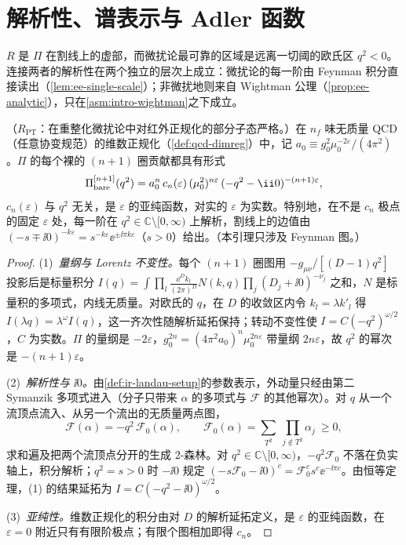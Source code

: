\section{解析性、谱表示与 Adler 函数}\label{sec:ee-analytic}

$R$ 是 $\Pi$ 在割线上的虚部，而微扰论最可靠的区域是远离一切阈的欧氏区 $q^2<0$。连接两者的解析性在两个独立的层次上成立：微扰论的每一阶由 Feynman 积分直接读出（\cref{lem:ee-single-scale}）；非微扰地则来自 Wightman 公理（\cref{prop:ee-analytic}），只在\cref{asm:intro-wightman}之下成立。

\begin{lemma}\label{lem:ee-single-scale}
（$R_{\mathrm{PT}}$：在重整化微扰论中对红外正规化的部分子态严格。）在 $n_f$ 味无质量 QCD（任意协变规范）的维数正规化（\cref{def:qcd-dimreg}）中，记 $a_0\equiv g_0^2\mu_0^{-2\varepsilon}/(4\pi^2)$。$\Pi$ 的每个裸的 $(n+1)$ 圈贡献都具有形式
\begin{equation}\label{eq:ee-single-scale}
\Pi^{[n+1]}_{\rm bare}(q^2)=a_0^n\,c_n(\varepsilon)\,(\mu_0^2)^{n\varepsilon}\,(-q^2-\ii0)^{-(n+1)\varepsilon},
\end{equation}
$c_n(\varepsilon)$ 与 $q^2$ 无关，是 $\varepsilon$ 的亚纯函数，对实的 $\varepsilon$ 为实数。特别地，在不是 $c_n$ 极点的固定 $\varepsilon$ 处，每一阶在 $q^2\in\mathbb C\setminus[0,\infty)$ 上解析，割线上的边值由 $(-s\mp\ii0)^{-k\varepsilon}=s^{-k\varepsilon}\ee^{\pm\ii\pi k\varepsilon}$（$s>0$）给出。（本引理只涉及 Feynman 图。）
\end{lemma}
\begin{proof}
(1)~\emph{量纲与 Lorentz 不变性。}每个 $(n+1)$ 圈图用 $-g_{\mu\nu}/[(D-1)q^2]$ 投影后是标量积分 $I(q)=\int\prod_l\frac{\dd^Dk_l}{(2\pi)^D}N(k,q)\prod_j(D_j+\ii0)^{-\nu_j}$ 之和，$N$ 是标量积的多项式，内线无质量。对欧氏的 $q$，在 $D$ 的收敛区内令 $k_l=\lambda k'_l$ 得 $I(\lambda q)=\lambda^\omega I(q)$，这一齐次性随解析延拓保持；转动不变性使 $I=C(-q^2)^{\omega/2}$，$C$ 为实数。$\Pi$ 的量纲是 $-2\varepsilon$，$g_0^{2n}=(4\pi^2a_0)^n\mu_0^{2n\varepsilon}$ 带量纲 $2n\varepsilon$，故 $q^2$ 的幂次是 $-(n+1)\varepsilon$。

(2)~\emph{解析性与 $\ii0$。}由\cref{def:ir-landau-setup}的参数表示，外动量只经由第二 Symanzik 多项式进入（分子只带来 $\alpha$ 的多项式与 $\mathcal F$ 的其他幂次）。对 $q$ 从一个流顶点流入、从另一个流出的无质量两点图，
\begin{equation}\label{eq:ee-F0}
\mathcal F(\alpha)=-q^2\,\mathcal F_0(\alpha),\qquad \mathcal F_0(\alpha)=\sum_{T^2}\ \prod_{j\notin T^2}\alpha_j\ \ge0 ,
\end{equation}
求和遍及把两个流顶点分开的生成 2-森林\cite{Bogner:2010kv}。对 $q^2\in\mathbb C\setminus[0,\infty)$，$-q^2\mathcal F_0$ 不落在负实轴上，积分解析；$q^2=s>0$ 时 $-\ii0$ 规定 $(-s\mathcal F_0-\ii0)^c=\mathcal F_0^cs^c\ee^{-\ii\pi c}$。由恒等定理，(1) 的结果延拓为 $I=C(-q^2-\ii0)^{\omega/2}$。

(3)~\emph{亚纯性。}维数正规化的积分由对 $D$ 的解析延拓定义，是 $\varepsilon$ 的亚纯函数，在 $\varepsilon=0$ 附近只有有限阶极点\cite{tHooftVeltman1972,Collins1984}；有限个图相加即得 $c_n$。
\end{proof}

